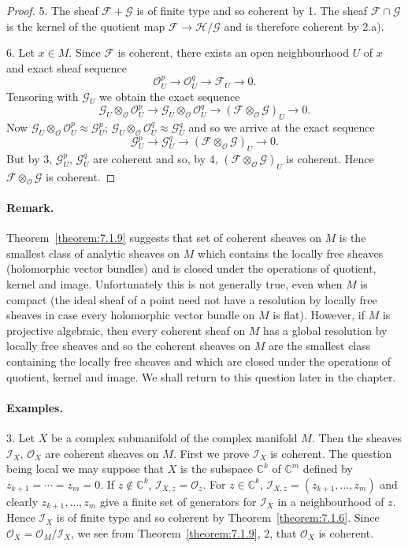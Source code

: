\begin{proof}
5. The sheaf $\mathcal{F}+\mathcal{G}$ is of finite type and so coherent by 1. The sheaf $\mathcal{F}\cap\mathcal{G}$ is the kernel of the quotient map $\mathcal{F}\to\mathcal{H}/\mathcal{G}$ and is therefore coherent by 2.a).

6. Let $x\in M$. Since $\mathcal{F}$ is coherent, there exists an open neighbourhood $U$ of $x$ and exact sheaf sequence
\[
\mathcal{O}_U^p\to\mathcal{O}_U^q\to\mathcal{F}_U\to0.
\]
Tensoring with $\mathcal{G}_U$ we obtain the exact sequence
\[
\mathcal{G}_U\otimes_{\mathcal{O}}\mathcal{O}_U^p\to\mathcal{G}_U\otimes_{\mathcal{O}}\mathcal{O}_U^q\to(\mathcal{F}\otimes_{\mathcal{O}}\mathcal{G})_U\to0.
\]
Now $\mathcal{G}_U\otimes_{\mathcal{O}}\mathcal{O}_U^p\approx\mathcal{G}_U^p$; $\mathcal{G}_U\otimes_{\mathcal{O}}\mathcal{O}_U^q\approx\mathcal{G}_U^q$ and so we arrive at the exact sequence
\[
\mathcal{G}_U^p\to\mathcal{G}_U^q\to(\mathcal{F}\otimes_{\mathcal{O}}\mathcal{G})_U\to0.
\]
But by 3, $\mathcal{G}_U^p$, $\mathcal{G}_U^q$ are coherent and so, by 4, $(\mathcal{F}\otimes_{\mathcal{O}}\mathcal{G})_U$ is coherent. Hence $\mathcal{F}\otimes_{\mathcal{O}}\mathcal{G}$ is coherent.
\end{proof}
\paragraph{Remark.} Theorem~\ref{theorem:7.1.9} suggests that set of coherent sheaves on $M$ is the smallest class of analytic sheaves on $M$ which contains the locally free sheaves (holomorphic vector bundles) and is closed under the operations of quotient, kernel and image. Unfortunately this is not generally true, even when $M$ is compact (the ideal sheaf of a point need not have a resolution by locally free sheaves in case every holomorphic vector bundle on $M$ is flat). However, if $M$ is projective algebraic, then every coherent sheaf on $M$ has a global resolution by locally free sheaves and so the coherent sheaves on $M$ are the smallest class containing the locally free sheaves and which are closed under the operations of quotient, kernel and image. We shall return to this question later in the chapter.
\paragraph{Examples.}
3. Let $X$ be a complex submanifold of the complex manifold $M$. Then the sheaves $\mathcal{I}_X$, $\mathcal{O}_X$ are coherent sheaves on $M$. First we prove $\mathcal{I}_X$ is coherent. The question being local we may suppose that $X$ is the subspace $\mathbb{C}^k$ of $\mathbb{C}^m$ defined by $z_{k+1}=\cdots=z_m=0$. If $z\notin\mathbb{C}^k$, $\mathcal{I}_{X,z}=\mathcal{O}_z$.
For $z\in\mathbb{C}^k$, $\mathcal{I}_{X,z}=(z_{k+1},\ldots,z_m)$ and clearly $z_{k+1},\ldots,z_m$ give a finite set of generators for $\mathcal{I}_X$ in a neighbourhood of $z$. Hence $\mathcal{I}_X$ is of finite type and so coherent by Theorem~\ref{theorem:7.1.6}. Since $\mathcal{O}_X=\mathcal{O}_M/\mathcal{I}_X$, we see from Theorem~\ref{theorem:7.1.9}, 2, that $\mathcal{O}_X$ is coherent.

